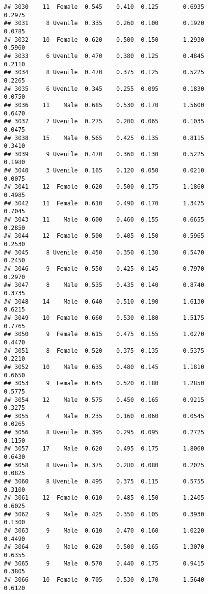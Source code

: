 \documentclass[
]{article}
\begin{document}
\begin{verbatim}
## 3030    11  Female  0.545    0.410  0.125       0.6935         0.2975
## 3031     8 Uvenile  0.335    0.260  0.100       0.1920         0.0785
## 3032    10  Female  0.620    0.500  0.150       1.2930         0.5960
## 3033     6 Uvenile  0.470    0.380  0.125       0.4845         0.2110
## 3034     8 Uvenile  0.470    0.375  0.125       0.5225         0.2265
## 3035     6 Uvenile  0.345    0.255  0.095       0.1830         0.0750
## 3036    11    Male  0.685    0.530  0.170       1.5600         0.6470
## 3037     7 Uvenile  0.275    0.200  0.065       0.1035         0.0475
## 3038    15    Male  0.565    0.425  0.135       0.8115         0.3410
## 3039     9 Uvenile  0.470    0.360  0.130       0.5225         0.1980
## 3040     3 Uvenile  0.165    0.120  0.050       0.0210         0.0075
## 3041    12  Female  0.620    0.500  0.175       1.1860         0.4985
## 3042    11  Female  0.610    0.490  0.170       1.3475         0.7045
## 3043    11    Male  0.600    0.460  0.155       0.6655         0.2850
## 3044    12  Female  0.500    0.405  0.150       0.5965         0.2530
## 3045     8 Uvenile  0.450    0.350  0.130       0.5470         0.2450
## 3046     9  Female  0.550    0.425  0.145       0.7970         0.2970
## 3047     8    Male  0.535    0.435  0.140       0.8740         0.3735
## 3048    14    Male  0.640    0.510  0.190       1.6130         0.6215
## 3049    10  Female  0.660    0.530  0.180       1.5175         0.7765
## 3050     9  Female  0.615    0.475  0.155       1.0270         0.4470
## 3051     8  Female  0.520    0.375  0.135       0.5375         0.2210
## 3052    10    Male  0.635    0.480  0.145       1.1810         0.6650
## 3053     9  Female  0.645    0.520  0.180       1.2850         0.5775
## 3054    12    Male  0.575    0.450  0.165       0.9215         0.3275
## 3055     4    Male  0.235    0.160  0.060       0.0545         0.0265
## 3056     8 Uvenile  0.395    0.295  0.095       0.2725         0.1150
## 3057    17    Male  0.620    0.495  0.175       1.8060         0.6430
## 3058     8 Uvenile  0.375    0.280  0.080       0.2025         0.0825
## 3060     8 Uvenile  0.495    0.375  0.115       0.5755         0.3100
## 3061    12  Female  0.610    0.485  0.150       1.2405         0.6025
## 3062     9    Male  0.425    0.350  0.105       0.3930         0.1300
## 3063     9    Male  0.610    0.470  0.160       1.0220         0.4490
## 3064     9    Male  0.620    0.500  0.165       1.3070         0.6355
## 3065     9    Male  0.570    0.440  0.175       0.9415         0.3805
## 3066    10  Female  0.705    0.530  0.170       1.5640         0.6120

\end{verbatim}
\end{document}
